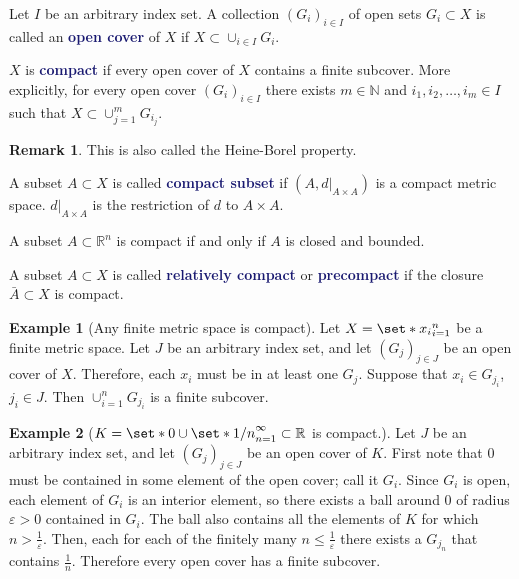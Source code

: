 \documentclass[11pt]{article}
\numberwithin{equation}{section}
\newcommand{\navy}[1]{\textcolor{MidnightBlue}{\bf #1}}
\theoremstyle{definition}
\theoremstyle{definition}
\newtheorem{example}{\color{WildStrawberry}Example}[section]
\newtheorem*{remark}{Remark}
\def\Set{\set*}%
\def\ss{\subset}
\newcommand{\1}{\mathbbm 1}
\newcommand{\e}{\varepsilon}
\newcommand{\RR}{\mathbb R}
\newcommand{\NN}{\mathbb N}
\begin{document}
\begin{definition}
	Let $I$ be an arbitrary index set. A collection $(G_i)_{i \in I}$ of open sets $G_i \subset X$ is called an \navy{open cover} of $X$ if $X \subset \cup_{i \in I} G_{i}$.
\end{definition}

\begin{definition}[Compact]
	$X$ is \navy{compact} if every open cover of $X$ contains a finite subcover. More explicitly, for every open cover $(G_i)_{i \in I}$ there exists $m \in \NN$ and $i_1, i_2, \ldots, i_m \in I$ such that $X \subset \cup_{j=1}^m G_{i_j}$.
	\begin{remark}
		This is also called the Heine-Borel property. 
	\end{remark}
\end{definition}

\begin{definition}
	A subset $A \subset X$ is called \navy{compact subset} if $(A,d\vert_{A\times A})$ is a compact metric space. $d\vert_{A\times A}$ is the restriction of $d$ to $A \times A$.  
\end{definition}

\begin{theorem}
	A subset $A \subset \RR^n$ is compact if and only if $A$ is closed and bounded.
\end{theorem}

\begin{definition}
	A subset $A \ss X$ is called \navy{relatively compact} or \navy{precompact} if the closure $\bar{A} \ss X$ is compact. 
\end{definition}

\begin{example}[Any finite metric space is compact]
	Let $X = \Set{x_i}_{i=1}^n$ be a finite metric space. Let $J$ be an arbitrary index set, and let $(G_j)_{j \in J}$ be an open cover of $X$. Therefore, each $x_i$ must be in at least one $G_j$. Suppose that $x_i \in G_{j_i}$, $j_i \in J$. Then $\cup_{i=1}^n G_{j_i}$ is a finite subcover. 
\end{example}

\begin{example}[$K = \Set{0} \cup \Set{1/n}_{n=1}^\infty \subset \RR$ is compact.]
	Let $J$ be an arbitrary index set, and let $(G_j)_{j \in J}$ be an open cover of $K$. First note that $0$ must be contained in some element of the open cover; call it $G_i$. Since $G_i$ is open, each element of $G_i$ is an interior element, so there exists a ball around $0$ of radius $\e > 0$ contained in $G_i$. The ball also contains all the elements of $K$ for which $n > \frac{1}{\e}$. Then, each for each of the finitely many $n \leq \frac{1}{\e}$ there exists a $G_{j_n}$ that contains $\frac{1}{n}$. Therefore every open cover has a finite subcover.
\end{example}
\end{document}
